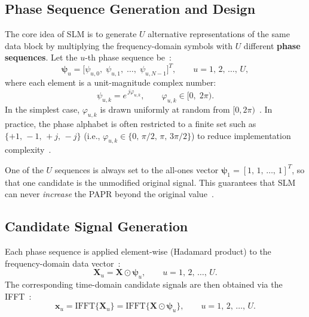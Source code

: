\subsection{Phase Sequence Generation and Design}

The core idea of SLM is to generate $U$ alternative representations of the
same data block by multiplying the frequency-domain symbols with $U$ different
\textbf{phase sequences}.  Let the $u$-th phase sequence be~\cite{ali2016new}:
\begin{equation}
    \bm{\psi}_u = \bigl[\psi_{u,0},\;\psi_{u,1},\;\dots,\;\psi_{u,N-1}\bigr]^T,
    \qquad u = 1,\,2,\,\dots,\,U,
    \label{eq:phase_sequence}
\end{equation}
where each element is a unit-magnitude complex number:
\begin{equation}
    \psi_{u,k} = e^{\,j\varphi_{u,k}},
    \qquad \varphi_{u,k} \in [0,\;2\pi).
    \label{eq:phase_element}
\end{equation}
In the simplest case, $\varphi_{u,k}$ is drawn uniformly at random
from $[0,2\pi)$~\cite{ali2016new}.  In practice, the phase alphabet is often
restricted to a finite set such as $\{+1,\,-1,\,+j,\,-j\}$
(i.e., $\varphi_{u,k} \in \{0,\, \pi/2,\, \pi,\, 3\pi/2\}$)
to reduce implementation complexity~\cite{ali2016new}.

\begin{keyinsight}
    One of the $U$ sequences is always set to the all-ones vector
    $\bm{\psi}_1 = [1,\,1,\,\dots,\,1]^T$, so that one candidate is the
    unmodified original signal.  This guarantees that SLM can never
    \emph{increase} the PAPR beyond the original value~\cite{ali2016new}.
\end{keyinsight}

\subsection{Candidate Signal Generation}

Each phase sequence is applied element-wise (Hadamard product) to the
frequency-domain data vector~\cite{ali2016new}:
\begin{equation}
    \bm{X}_u = \bm{X} \odot \bm{\psi}_u,
    \qquad u = 1,\,2,\,\dots,\,U.
    \label{eq:slm_candidates_freq}
\end{equation}
The corresponding time-domain candidate signals are then obtained via the
IFFT~\cite{ali2016new}:
\begin{equation}
    \bm{x}_u = \mathrm{IFFT}\{\bm{X}_u\}
             = \mathrm{IFFT}\{\bm{X} \odot \bm{\psi}_u\},
    \qquad u = 1,\,2,\,\dots,\,U.
    \label{eq:slm_candidates_time}
\end{equation}

